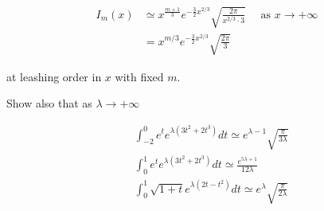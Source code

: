 \documentclass[10pt]{article}
\begin{document}
$$
\begin{aligned}
I_{m}(x) & \simeq x^{\frac{m+1}{3}} e^{-\frac{3}{2} x^{2 / 3}} \sqrt{\frac{2 \pi}{x^{2 / 3} \cdot 3}} \quad \text { as } x \rightarrow+\infty \\
& =x^{m / 3} e^{-\frac{3}{2} x^{2 / 3}} \sqrt{\frac{2 \pi}{3}}
\end{aligned}
$$

at leashing order in $x$ with fixed $m$.

Show also that as $\lambda \rightarrow+\infty$

$$
\begin{aligned}
& \int_{-2}^{0} e^{t} e^{\lambda\left(3 t^{2}+2 t^{3}\right)} d t \simeq e^{\lambda-1} \sqrt{\frac{\pi}{3 \lambda}} \\
& \int_{0}^{1} e^{t} e^{\lambda\left(3 t^{2}+2 t^{3}\right)} d t \simeq \frac{e^{5 \lambda+1}}{12 \lambda} \\
& \int_{0}^{1} \sqrt{1+t} e^{\lambda\left(2 t-t^{2}\right)} d t \simeq e^{\lambda} \sqrt{\frac{\pi}{2 \lambda}}
\end{aligned}
$$
\end{document}
